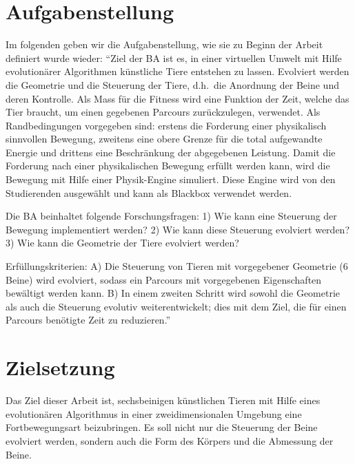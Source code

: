   \section{Aufgabenstellung}

    Im folgenden geben wir die Aufgabenstellung, wie sie zu Beginn der Arbeit definiert wurde wieder:
    ``Ziel der BA ist es,
    in einer virtuellen Umwelt mit Hilfe evolutionärer Algorithmen künstliche Tiere entstehen zu lassen.
    Evolviert werden die Geometrie und die Steuerung der Tiere,
    d.h.\ die Anordnung der Beine und deren Kontrolle.
    Als Mass für die Fitness wird eine Funktion der Zeit, welche das Tier braucht,
    um einen gegebenen Parcours zurückzulegen, verwendet.
    Als Randbedingungen vorgegeben sind: erstens die Forderung einer physikalisch sinnvollen Bewegung,
    zweitens eine obere Grenze für die total aufgewandte Energie und drittens eine Beschränkung der abgegebenen Leistung.
    Damit die Forderung nach einer physikalischen Bewegung erfüllt werden kann,
    wird die Bewegung mit Hilfe einer Physik-Engine simuliert.
    Diese Engine wird von den Studierenden ausgewählt und kann als Blackbox verwendet werden.

    \medskip

    Die BA beinhaltet folgende Forschungsfragen: 1) Wie kann eine Steuerung der Bewegung implementiert werden?
    2) Wie kann diese Steuerung evolviert werden? 3) Wie kann die Geometrie der Tiere evolviert werden?

    \medskip

    Erfüllungskriterien: A) Die Steuerung von Tieren mit vorgegebener Geometrie (6 Beine) wird evolviert,
    sodass ein Parcours mit vorgegebenen Eigenschaften bewältigt werden kann.
    B) In einem zweiten Schritt wird sowohl die Geometrie als auch die Steuerung evolutiv weiterentwickelt;
    dies mit dem Ziel, die für einen Parcours benötigte Zeit zu reduzieren.''~\cite{Task}

  \section{Zielsetzung}

    Das Ziel dieser Arbeit ist, sechsbeinigen künstlichen Tieren mit Hilfe eines evolutionären Algorithmus
    in einer zweidimensionalen Umgebung eine Fortbewegungsart beizubringen.
    Es soll nicht nur die Steuerung der Beine evolviert werden,
    sondern auch die Form des Körpers und die Abmessung der Beine.

    \medskip

